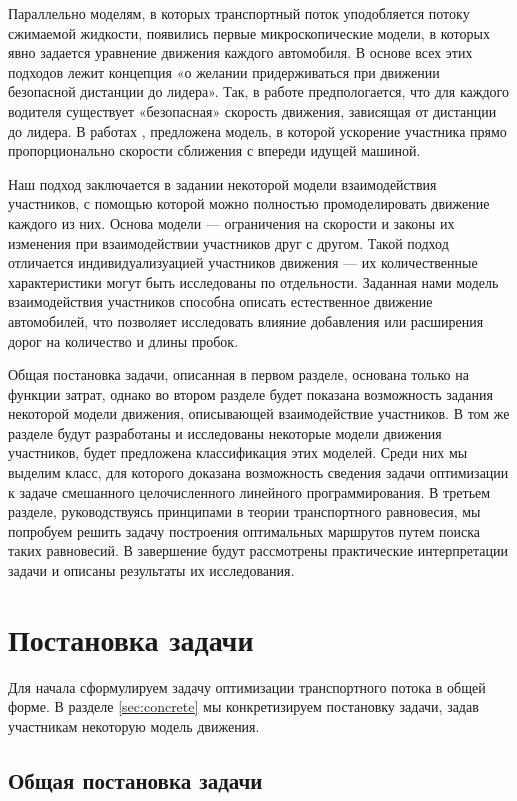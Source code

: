 \documentclass[12pt, a4paper]{article}
\begin{document}
Параллельно моделям, в которых транспортный поток уподобляется потоку сжимаемой жидкости, 
появились первые микроскопические модели, в которых явно задается уравнение движения каждого автомобиля. В основе всех этих подходов лежит концепция «о желании придерживаться при движении безопасной дистанции до лидера». Так, в работе \cite{micro_newell} предпологается, что для каждого водителя существует «безопасная» скорость движения, зависящая от дистанции до лидера. В работах \cite{micro_gen_mot_1}, \cite{micro_gen_mot_2} предложена модель, в которой ускорение участника прямо пропорционально скорости сближения с впереди идущей машиной.

Наш подход заключается в задании некоторой модели взаимодействия участников, с помощью которой можно полностью промоделировать движение каждого из них. 
Основа модели --- ограничения на скорости и законы их изменения при взаимодействии участников друг с другом. Такой подход отличается индивидуализуацией участников движения --- их количественные характеристики могут быть исследованы по отдельности. Заданная нами модель взаимодействия участников способна описать естественное движение автомобилей, что позволяет исследовать влияние добавления или расширения дорог на количество и длины пробок.

Общая постановка задачи, описанная в первом разделе, основана только на функции затрат, 
однако во втором разделе будет показана возможность задания некоторой модели движения, описывающей взаимодействие участников.
В том же разделе будут разработаны и исследованы некоторые модели движения участников, будет предложена классификация этих моделей. Среди них мы выделим класс, для которого доказана возможность сведения задачи оптимизации к задаче смешанного целочисленного линейного программирования. В третьем разделе, руководствуясь принципами в теории транспортного равновесия, мы попробуем решить задачу построения оптимальных маршрутов путем поиска таких равновесий. В завершение будут рассмотрены практические интерпретации задачи и описаны результаты их исследования.

\newpage
\section{Постановка задачи}

Для начала сформулируем задачу оптимизации транспортного потока в общей форме.
В разделе \ref{sec:concrete} мы конкретизируем постановку задачи, задав участникам некоторую модель движения.

\subsection{Общая постановка задачи}
\end{document}
